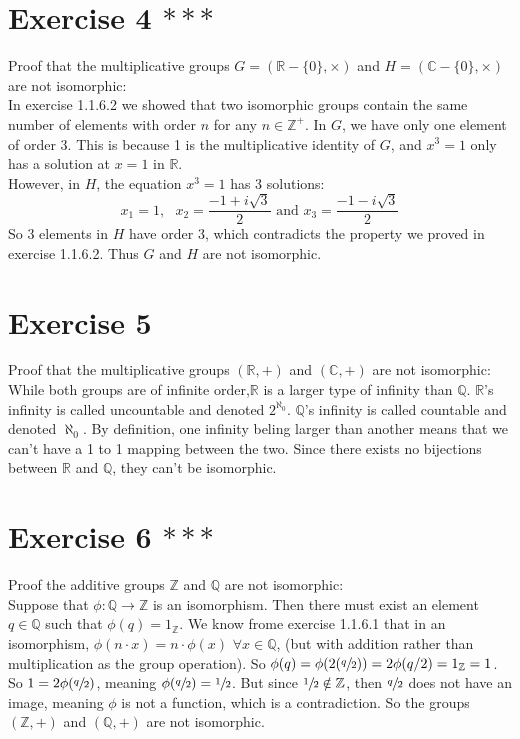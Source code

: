 \documentclass[12pt]{article}
\newcommand{\Z}{\mathbb{Z}}
\newcommand{\Q}{\mathbb{Q}}
\newcommand{\R}{\mathbb{R}}
\newcommand{\C}{\mathbb{C}}
\begin{document}
    \section*{Exercise 4 $***$}
    Proof that the multiplicative groups $G = (\R - \{0\}, \times)$
    and $H = (\C - \{0\}, \times)$ are not isomorphic: \\
    In exercise 1.1.6.2 we showed that two isomorphic groups contain the same
    number of elements with order $n$ for any $n \in \Z^+$.
    In $G$, we have only one element of order 3.
    This is because 1 is the multiplicative identity of $G$,
    and $x^3 = 1$ only has a solution at $x = 1$ in $\R$. \\
    However, in $H$, the equation $x^3 = 1$ has 3 solutions:
    \[x_1 = 1, \text{ } x_2 = \dfrac{-1 + i\sqrt{3}}{2}
    \text{ and } x_3 = \dfrac{-1 - i\sqrt{3}}{2}\]
    So 3 elements in $H$ have order 3,
    which contradicts the property we proved in exercise 1.1.6.2.
    Thus $G$ and $H$ are not isomorphic. 
    

    \section*{Exercise 5}
    Proof that the multiplicative groups $(\R, +)$
    and $(\C, +)$ are not isomorphic: \\
    While both groups are of infinite order,$
    \R$ is a larger type of infinity than $\Q$.
    $\R$'s infinity is called uncountable and denoted $2^{\aleph_0}$.
    $\Q$'s infinity is called countable and denoted $\aleph_0$.
    By definition, one infinity beling larger than another means that
    we can't have a 1 to 1 mapping between the two.
    Since there exists no bijections between $\R$ and $\Q$,
    they can't be isomorphic.


    \section*{Exercise 6 $***$}
    Proof the additive groups $\Z$ and $\Q$ are not isomorphic: \\
    Suppose that $\phi: \Q \to \Z$ is an isomorphism.
    Then there must exist an element $q \in \Q$
    such that $\phi(q) = 1_\Z$.
    We know frome exercise 1.1.6.1 that in an isomorphism,
    $\phi(n \cdot x) = n \cdot \phi(x)$ $\forall x \in \Q$,
    (but with addition rather than multiplication as the group operation).
    So $\phi(q) = \phi(2(\sfrac{q}{2})) = 2\phi(q/2) = 1_\Z = 1$.
    So $1 = 2\phi(\sfrac{q}{2})$, meaning $\phi(\sfrac{q}{2}) = \sfrac{1}{2}$.
    But since $\sfrac{1}{2} \notin \Z$,
    then $\sfrac{q}{2}$ does not have an image,
    meaning $\phi$ is not a function, which is a contradiction.
    So the groups $(\Z, +)$ and $(\Q, +)$ are not isomorphic.
\end{document}
